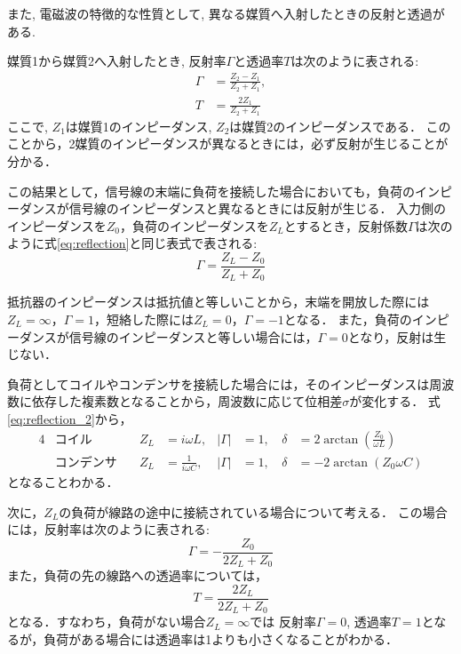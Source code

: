 \documentclass[uplatex,dvipdfmx,a4j,12pt]{jsarticle}
\begin{document}
\enskip

また, 電磁波の特徴的な性質として, 異なる媒質へ入射したときの反射と透過がある.

媒質1から媒質2へ入射したとき, 反射率$\Gamma$と透過率$T$は次のように表される:
\begin{align}
  \Gamma &= \frac{Z_2 - Z_1}{Z_2 + Z_1}, \label{eq:reflection}\\
  T &= \frac{2Z_1}{Z_2 + Z_1}
\end{align}
ここで, $Z_1$は媒質1のインピーダンス, $Z_2$は媒質2のインピーダンスである．
このことから，2媒質のインピーダンスが異なるときには，必ず反射が生じることが分かる．

この結果として，信号線の末端に負荷を接続した場合においても，負荷のインピーダンスが信号線のインピーダンスと異なるときには反射が生じる．
入力側のインピーダンスを$Z_0$，負荷のインピーダンスを$Z_L$とするとき，反射係数$\Gamma$は次のように式\eqref{eq:reflection}と同じ表式で表される:
\begin{equation}
  \Gamma = \frac{Z_L - Z_0}{Z_L + Z_0} \label{eq:reflection_2}
\end{equation}

抵抗器のインピーダンスは抵抗値と等しいことから，末端を開放した際には$Z_L = \infty$，$\Gamma = 1$，短絡した際には$Z_L = 0$，$\Gamma = -1$となる．
また，負荷のインピーダンスが信号線のインピーダンスと等しい場合には，$\Gamma = 0$となり，反射は生じない．

負荷としてコイルやコンデンサを接続した場合には，そのインピーダンスは周波数に依存した複素数となることから，周波数に応じて位相差$\sigma$が変化する．
式\eqref{eq:reflection_2}から， 
\begin{alignat}{4}
  &\text{コイル}\quad & Z_L &= i\omega L, & |\Gamma| &= 1, & \delta &= 2\arctan\left(\frac{ Z_0}{ \omega L}\right) \label{eq:coil_phase}\\
  &\text{コンデンサ}\quad & Z_L &= \frac{1}{i\omega C},\, & |\Gamma| &= 1,\, & \delta &= -2\arctan\left({Z_0\omega C}\right) \label{eq:condenser_phase}
\end{alignat}
となることわかる．

次に，$Z_L$の負荷が線路の途中に接続されている場合について考える．
この場合には，反射率は次のように表される:
\begin{equation}
  \Gamma = -\frac{Z_0}{2Z_L + Z_0}
\end{equation}
また，負荷の先の線路への透過率については，
\begin{equation}
  T = \frac{2Z_L}{2Z_L + Z_0}
  \label{eq:transmission}
\end{equation}
となる．すなわち，負荷がない場合$Z_L = \infty$では 反射率$\Gamma =  0$, 透過率$T = 1$となるが，負荷がある場合には透過率は1よりも小さくなることがわかる．
\end{document}
